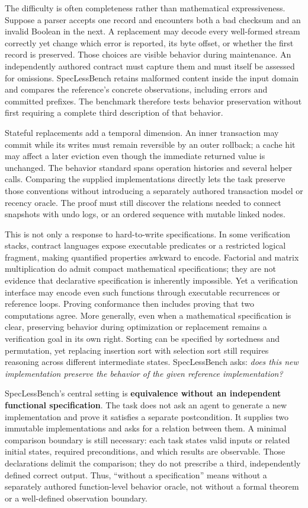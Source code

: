 \documentclass{article}
\begin{document}
The difficulty is often completeness rather than mathematical expressiveness. Suppose a parser accepts one record and encounters both a bad checksum and an invalid Boolean in the next. A replacement may decode every well-formed stream correctly yet change which error is reported, its byte offset, or whether the first record is preserved. Those choices are visible behavior during maintenance. An independently authored contract must capture them and must itself be assessed for omissions. SpecLessBench retains malformed content inside the input domain and compares the reference's concrete observations, including errors and committed prefixes. The benchmark therefore tests behavior preservation without first requiring a complete third description of that behavior.

Stateful replacements add a temporal dimension. An inner transaction may commit while its writes must remain reversible by an outer rollback; a cache hit may affect a later eviction even though the immediate returned value is unchanged. The behavior standard spans operation histories and several helper calls. Comparing the supplied implementations directly lets the task preserve those conventions without introducing a separately authored transaction model or recency oracle. The proof must still discover the relations needed to connect snapshots with undo logs, or an ordered sequence with mutable linked nodes.

This is not only a response to hard-to-write specifications. In some verification stacks, contract languages expose executable predicates or a restricted logical fragment, making quantified properties awkward to encode. Factorial and matrix multiplication do admit compact mathematical specifications; they are not evidence that declarative specification is inherently impossible. Yet a verification interface may encode even such functions through executable recurrences or reference loops. Proving conformance then includes proving that two computations agree. More generally, even when a mathematical specification is clear, preserving behavior during optimization or replacement remains a verification goal in its own right. Sorting can be specified by sortedness and permutation, yet replacing insertion sort with selection sort still requires reasoning across different intermediate states. SpecLessBench asks: \emph{does this new implementation preserve the behavior of the given reference implementation?}

SpecLessBench's central setting is \textbf{equivalence without an independent functional specification}. The task does not ask an agent to generate a new implementation and prove it satisfies a separate postcondition. It supplies two immutable implementations and asks for a relation between them. A minimal comparison boundary is still necessary: each task states valid inputs or related initial states, required preconditions, and which results are observable. Those declarations delimit the comparison; they do not prescribe a third, independently defined correct output. Thus, “without a specification” means without a separately authored function-level behavior oracle, not without a formal theorem or a well-defined observation boundary.
\end{document}
